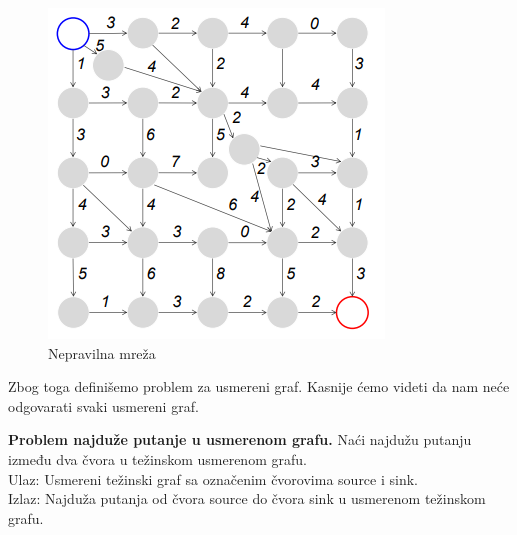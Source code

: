 \begin{minipage}{\textwidth}
\begin{minipage}{0.45\textwidth}
\begin{figure}[H]
			\includegraphics[width=\textwidth]{poglavlja/5/slike/menhetn3.png}
			\caption{Nepravilna mreža}
			\label{slika:menhetn3}
		\end{figure} 
	\end{minipage}
	\vspace*{1em}
\end{minipage}


\noindent Zbog toga definišemo problem za usmereni graf. Kasnije ćemo videti da nam neće odgovarati svaki usmereni graf.

\begin{tcolorbox}\textbf{Problem najduže putanje u usmerenom grafu.}
	Naći najdužu putanju između dva čvora u težinskom usmerenom grafu. \\
	Ulaz: Usmereni težinski graf sa označenim
čvorovima source i sink. \\
	Izlaz: Najduža putanja od čvora source do čvora
sink u usmerenom težinskom grafu. 
\end{tcolorbox}

